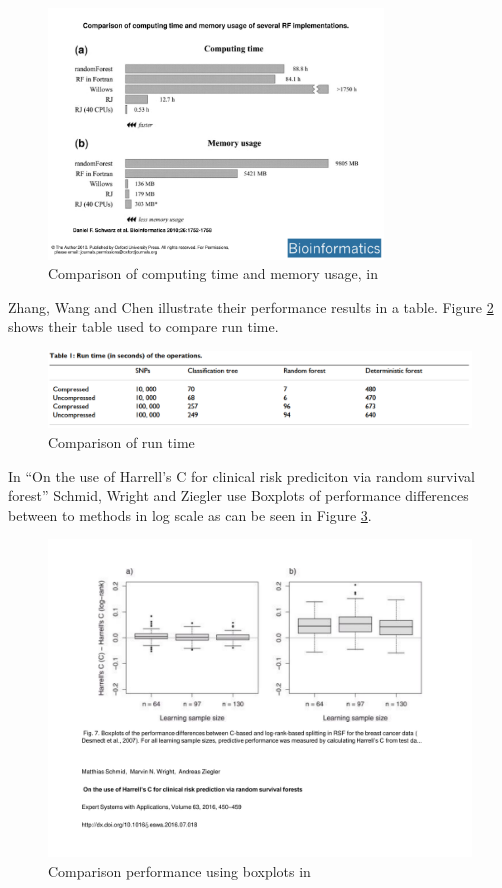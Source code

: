\documentclass{sig-alternate-05-2015}
\begin{document}
\begin{figure}
\centering
\includegraphics[width=3.5in]{onsafaribar}
\caption{Comparison of computing time and memory usage, in \cite{schwarz2010safari}}
\label{fig:onsafaribar}
\end{figure}

Zhang, Wang and Chen illustrate their performance results in a table. Figure \ref{fig:willowstable} shows their table used to compare run time.

\begin{figure}
\centering
\includegraphics[width=5in]{willowstable}
\caption{Comparison of run time \cite{zhang2009willows} }
\label{fig:willowstable}
\end{figure}

In ``On the use of Harrell's C for clinical risk prediciton via random survival forest'' Schmid, Wright and Ziegler use Boxplots of performance differences between to methods in log scale as can be seen in Figure \ref{fig:harrellscbox}.

\begin{figure}
\centering
\includegraphics[width=5in]{harrellscbox}
\caption{Comparison performance using boxplots in \cite{Schmid2016450}}
\label{fig:harrellscbox}
\end{figure}
\end{document}
